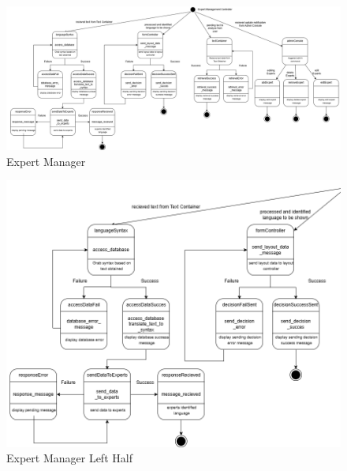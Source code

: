 \begin{figure}[H]
	\centering
	\includegraphics[width=\textwidth, height=\textheight, keepaspectratio]{Section2/images/Expert_Manager_state_diagramV3.png}
	\caption{Expert Manager}
	\label{ExpertManager}
\end{figure}

\begin{figure}[H]
	\centering
	\includegraphics[width=\textwidth, height=\textheight, keepaspectratio]{Section2/images/Expert_Manager_state_diagramV3_left_half.png}
	\caption{Expert Manager Left Half}
	\label{ExpertManagerp1}
\end{figure}


